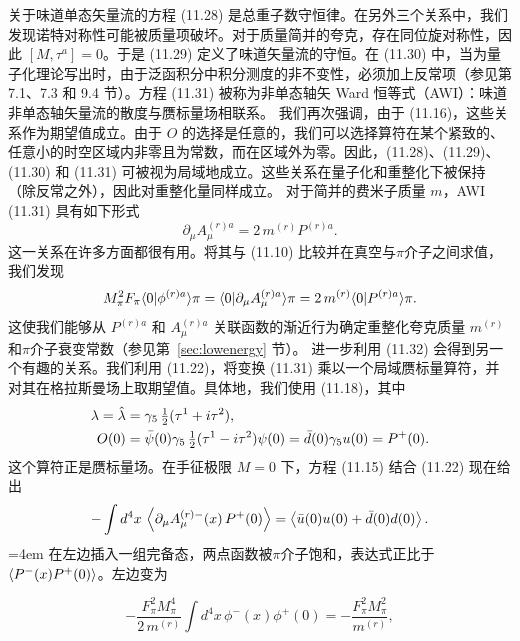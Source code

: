 关于味道单态矢量流的方程 (11.28) 是总重子数守恒律。在另外三个关系中，我们发现诺特对称性可能被质量项破坏。对于质量简并的夸克，存在同位旋对称性，因此 $[M, \tau^a] = 0$。于是 (11.29) 定义了味道矢量流的守恒。在 (11.30) 中，当为量子化理论写出时，由于泛函积分中积分测度的非不变性，必须加上反常项（参见第 7.1、7.3 和 9.4 节）。方程 (11.31) 被称为非单态轴矢 Ward 恒等式（AWI）：味道非单态轴矢量流的散度与赝标量场相联系。
我们再次强调，由于 (11.16)，这些关系作为期望值成立。由于 $O$ 的选择是任意的，我们可以选择算符在某个紧致的、任意小的时空区域内非零且为常数，而在区域外为零。因此，(11.28)、(11.29)、(11.30) 和 (11.31) 可被视为局域地成立。这些关系在量子化和重整化下被保持（除反常之外），因此对重整化量同样成立。
对于简并的费米子质量 $m$，AWI (11.31) 具有如下形式
\begin{equation}
\partial_\mu A_\mu^{(r)a} = 2\,m^{(r)} P^{(r)a} .
\end{equation}
这一关系在许多方面都很有用。将其与 (11.10) 比较并在真空与$\pi$介子之间求值，我们发现
\begin{equation}
M_\pi^2 F_\pi \langle0|\phi^{(r)a}\rangle{\pi}
= \langle0|\partial_\mu A_\mu^{(r)a}\rangle{\pi}
= 2\,m^{(r)} \langle0|P^{(r)a}\rangle{\pi} .
\end{equation}
这使我们能够从 $P^{(r)a}$ 和 $A_\mu^{(r)a}$ 关联函数的渐近行为确定重整化夸克质量 $m^{(r)}$ 和$\pi$介子衰变常数（参见第~\ref{sec:lowenergy} 节）。
进一步利用 (11.32) 会得到另一个有趣的关系。我们利用 (11.22)，将变换 (11.31) 乘以一个局域赝标量算符，并对其在格拉斯曼场上取期望值。具体地，我们使用 (11.18)，其中
\begin{equation}
\begin{aligned}
\lambda = \hat{\lambda} &= \gamma_5\,\tfrac{1}{2}(\tau^1 + i\tau^2) , \\
O(0) &= \bar{\psi}(0)\gamma_5\,\tfrac{1}{2}(\tau^1 - i\tau^2)\psi(0)
= \bar{d}(0)\gamma_5 u(0) = P^+(0) .
\end{aligned}
\end{equation}
这个算符正是赝标量场。在手征极限 $M = 0$ 下，方程 (11.15) 结合 (11.22) 现在给出
\begin{equation}
-\int d^4x\, \left\langle \partial_\mu A_\mu^{(r)-}(x)\, P^+(0) \right\rangle
= \left\langle \bar{u}(0)u(0) + \bar{d}(0)d(0) \right\rangle .
\end{equation}
\begingroup\emergencystretch=4em 在左边插入一组完备态，两点函数被$\pi$介子饱和，表达式正比于\linebreak[0] $\left\langle P^{-}(x)P^{+}(0) \right\rangle$。左边变为\par\endgroup
\begin{equation}
-\frac{F_\pi^2 M_\pi^4}{2\,m^{(r)}}\int d^4x\, \phi^-(x)\phi^+(0)
= -\frac{F_\pi^2 M_\pi^2}{m^{(r)}} ,
\end{equation}
